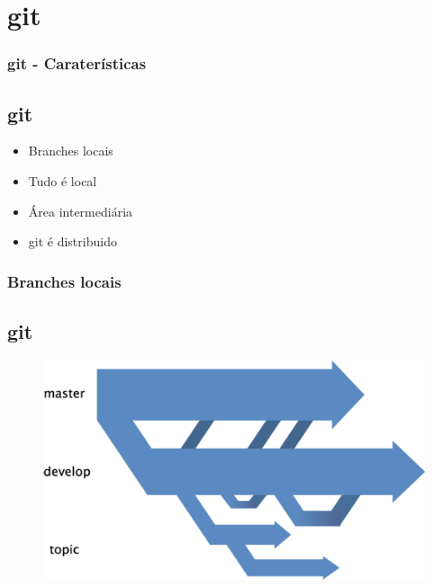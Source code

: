 \documentclass{beamer}
\begin{document}
  \section{git}
  \begin{frame}
    \frametitle{git - Caraterísticas}
    \subsection{git}
    \begin{itemize}
      \item Branches locais
      \item Tudo é local
      \item Área intermediária
      \item git é distribuido
    \end{itemize}
    \vfill
  \end{frame}

  \begin{frame}
    \frametitle{Branches locais}
    \subsection{git}
    \begin{figure}[htb]
     \begin{center}
    	\includegraphics[scale=0.7]{branches.png}
     \end{center}
    \end{figure}
    \vfill
  \end{frame}
\end{document}
